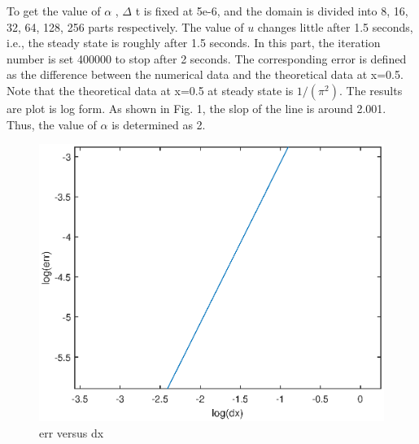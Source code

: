 \documentclass[a4paper,10pt]{article}
\begin{document}
To get the value of $\alpha$ , $\Delta$ t is fixed at 5e-6, and the domain is divided into 8, 16, 32, 64, 128, 256 parts respectively. The value of $u$ changes little after 1.5 seconds, i.e., the steady state is roughly after 1.5 seconds. In this part, the iteration number is set 400000 to stop after 2 seconds. The corresponding error is defined as the difference between the numerical data and the theoretical data at x=0.5. Note that the theoretical data at x=0.5 at steady state is $1/(\pi ^2)$. The results are plot is log form. As shown in Fig. 1, the slop of the line is around 2.001. Thus, the value of $\alpha$ is determined as 2.
\begin{figure}[h]
	\centering
	\includegraphics[scale=1]{alpha.eps}
	\caption{err versus dx}
\end{figure}
\end{document}
